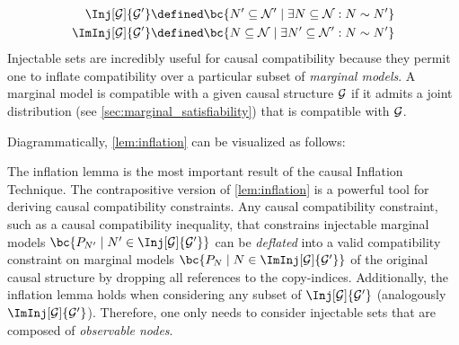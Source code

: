 \documentclass[aps, 10pt, english, twoside, pra, nofootinbib, tightenlines, longbibliography, superscriptaddress]{revtex4-1}
\begin{document}
    \begin{align*}
        \Inj[\graph]{\graph'} &\defined \bc{N' \subseteq \nodes' \mid \exists N \subseteq \nodes : N \sim N'} \\
        \ImInj[\graph]{\graph'} &\defined \bc{N \subseteq \nodes \mid \exists N' \subseteq \nodes' : N \sim N'}
    \end{align*}
    Injectable sets are incredibly useful for causal compatibility because they permit one to inflate compatibility over a particular subset of \textit{marginal models}. A marginal model is compatible with a given causal structure $\mathcal{G}$ if it admits a joint distribution (see \cref{sec:marginal_satisfiability}) that is compatible with $\mathcal{G}$.

    Diagrammatically, \cref{lem:inflation} can be visualized as follows:

    \begin{center}
    \end{center}

    The inflation lemma is the most important result of the causal Inflation Technique. The contrapositive version of \cref{lem:inflation} is a powerful tool for deriving causal compatibility constraints. Any causal compatibility constraint, such as a causal compatibility inequality, that constrains injectable marginal models $\bc{\prob[N'] \mid N' \in \Inj[\graph]{\graph'}}$ can be \textit{deflated} into a valid compatibility constraint on marginal models $\bc{\prob[N] \mid N \in \ImInj[\graph]{\graph'}}$ of the original causal structure by dropping all references to the copy-indices. Additionally, the inflation lemma holds when considering any subset of $\Inj[\graph]{\graph'}$ (analogously $\ImInj[\graph]{\graph'}$). Therefore, one only needs to consider injectable sets that are composed of \textit{observable nodes}.
\end{document}
